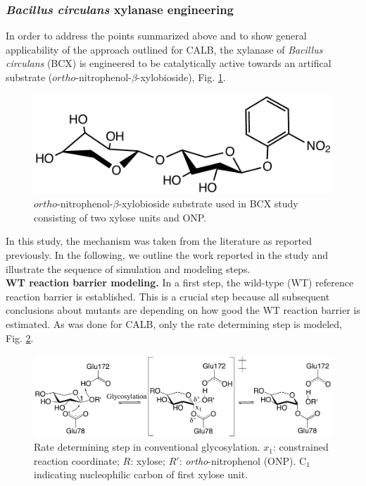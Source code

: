\subsubsection{\textit{Bacillus circulans} xylanase engineering}
In order to address the points summarized above and to show general applicability of the approach outlined for CALB, the xylanase of \textit{Bacillus circulans} (BCX) is engineered to be catalytically active towards an artifical substrate ($ortho$-nitrophenol-$\beta$-xylobioside), Fig. \ref{fig:substrate}.
\begin{figure}[htbp] 
\centering
\includegraphics[width=0.85\linewidth]{substrate.pdf}
\caption{
$ortho$-nitrophenol-$\beta$-xylobioside substrate used in BCX study consisting of two xylose units and ONP.
}
\label{fig:substrate}
\end{figure}
In this study, the mechanism was taken from the literature as reported previously\cite{joshi2000hydrogen,joshi2001dissecting}.
In the following, we outline the work reported in the study and illustrate the sequence of simulation and modeling steps.\\
\textbf{WT reaction barrier modeling.}
In a first step, the wild-type (WT) reference reaction barrier is established.
This is a crucial step because all subsequent conclusions about mutants are depending on how good the WT reaction barrier is estimated.
As was done for CALB, only the rate determining step is modeled, Fig. \ref{fig:bcx_mechanism}.
\begin{figure}[htbp] 
\centering
\includegraphics[width=1.0\linewidth]{mechanism.pdf}
\caption{
Rate determining step in conventional glycosylation. $x_1$: constrained reaction coordinate; $R$: xylose; 
$R'$: \textit{ortho}-nitrophenol (ONP).
C$_1$ indicating nucleophilic carbon of first xylose unit\cite{hediger2013computational}.
}
\label{fig:bcx_mechanism}
\end{figure}
